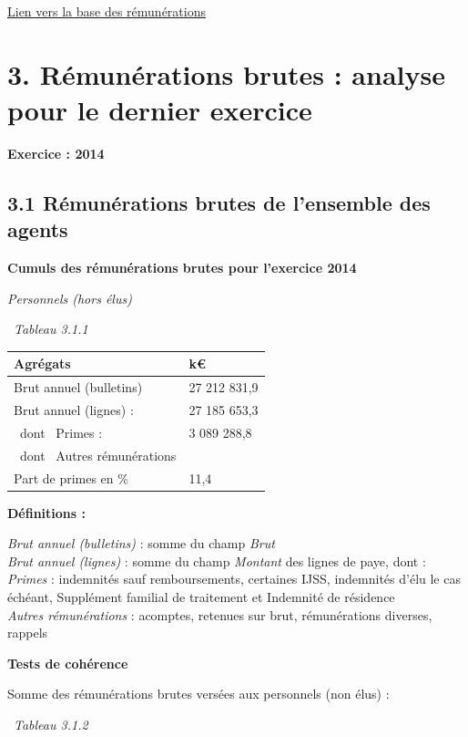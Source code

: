 \href{../Bases/Remunerations/Analyse.remunerations.csv}{Lien vers la base
des rémunérations}

\newpage

\hypertarget{remunerations-brutes-analyse-pour-le-dernier-exercice}{%
\section{3. Rémunérations brutes : analyse pour le dernier
exercice}\label{remunerations-brutes-analyse-pour-le-dernier-exercice}}

\textbf{Exercice : 2014 }

\hypertarget{remunerations-brutes-de-lensemble-des-agents-1}{%
\subsection{3.1 Rémunérations brutes de l'ensemble des
agents}\label{remunerations-brutes-de-lensemble-des-agents-1}}

\textbf{Cumuls des rémunérations brutes pour l'exercice 2014 }

\emph{Personnels (hors élus)}

~\emph{Tableau 3.1.1}

\begin{longtable}[]{@{}ll@{}}
\toprule
Agrégats & k€\tabularnewline
\midrule
\endhead
Brut annuel (bulletins) & 27 212 831,9\tabularnewline
Brut annuel (lignes) : & 27 185 653,3\tabularnewline
~dont ~Primes : & 3 089 288,8\tabularnewline
~dont ~Autres rémunérations &\tabularnewline
Part de primes en \% & 11,4\tabularnewline
\bottomrule
\end{longtable}

\textbf{Définitions :}

\emph{Brut annuel (bulletins)} : somme du champ \emph{Brut}\\
\emph{Brut annuel (lignes)} : somme du champ \emph{Montant} des lignes
de paye, dont :\\
\emph{Primes} : indemnités sauf remboursements, certaines IJSS,
indemnités d'élu le cas échéant, Supplément familial de traitement et
Indemnité de résidence\\
\emph{Autres rémunérations} : acomptes, retenues sur brut, rémunérations
diverses, rappels

\textbf{Tests de cohérence}

Somme des rémunérations brutes versées aux personnels (non élus) :

~\emph{Tableau 3.1.2}

